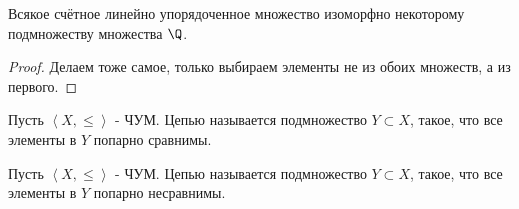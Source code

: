 \begin{theorem} \thmslashn

	Всякое счётное линейно упорядоченное множество изоморфно некоторому подмножеству множества $\Q$.
	\begin{proof} \thmslashn
	
		Делаем тоже самое, только выбираем элементы не из обоих множеств, а из первого.
	\end{proof}
\end{theorem}

\begin{definition} \thmslashn 

    Пусть $\left<X, \le\right>$ - ЧУМ. Цепью называется подмножество $Y \subset X$, такое, что все элементы в $Y$ попарно сравнимы.
\end{definition}
\begin{definition} \thmslashn 

    Пусть $\left<X, \le\right>$ - ЧУМ. Цепью называется подмножество $Y \subset X$, такое, что все элементы в $Y$ попарно несравнимы.
\end{definition}

